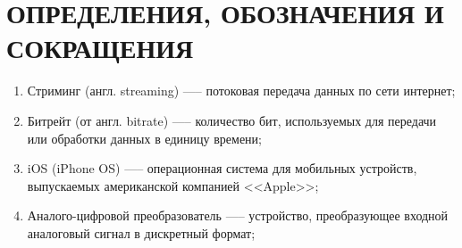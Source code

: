 \setupsectionstar
\section*{ОПРЕДЕЛЕНИЯ, ОБОЗНАЧЕНИЯ И СОКРАЩЕНИЯ}

\begin{enumerate}[leftmargin=1.6\parindent]

\item Стриминг (англ. streaming) —-- потоковая передача данных по сети интернет;
\item Битрейт (от англ. bitrate) —-- количество бит, используемых для передачи или обработки данных в единицу времени;
\item iOS (iPhone OS) —-- операционная система для мобильных устройств, выпускаемых американской компанией <<Apple>>;
\item Аналого-цифровой преобразователь —-- устройство, преобразующее входной аналоговый сигнал в дискретный формат;


\end{enumerate}
\pagebreak